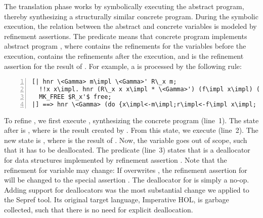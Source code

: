 \documentclass[a4paper,USenglish,cleveref, autoref]{lipics-v2019}
\begin{document}
The translation phase works by symbolically executing the abstract program, thereby synthesizing a structurally similar concrete program.
During the symbolic execution, the relation between the abstract and concrete variables is modeled by refinement assertions. 
The predicate  means that concrete program  implements abstract program ,
where  contains the refinements for the variables before the execution,  contains the 
refinements after the execution, and  is the refinement assertion for the result of . For example, a  is 
processed by the following rule:
\begin{lstlisting}[numbers=left]
[| hnr \<Gamma> m\impl \<Gamma>' R\_x m;
  !!x x\impl. hnr (R\_x x x\impl * \<Gamma>') (f\impl x\impl) ($R_x'$ x x\impl * \<Gamma>'') R\_y (f x);
  MK_FREE $R_x'$ free;
|] ==> hnr \<Gamma> (do {x\impl<-m\impl;r\impl<-f\impl x\impl; free x\impl; return r\impl}) \<Gamma>'' R\_y (do {x<-m; f x})
\end{lstlisting}
To refine , we first execute , synthesizing the concrete program  (line~1).
The state after  is , where  is the result created by .
From this state, we execute  (line~2). The new state is , where  is the result of .
Now, the variable  goes out of scope, such that it has to be deallocated. 
The predicate  (line~3) states that 
 is a deallocator for data structures implemented by refinement assertion . 
Note that the refinement for variable  may change: If  overwrites ,
the refinement assertion for  will be changed to the special assertion . 
The deallocator for  is simply a no-op.
%
Adding support for deallocators was the most substantial change we applied to the Sepref tool. Its original target 
language, Imperative HOL, is garbage collected, such that there is no need for explicit deallocation.
\end{document}

